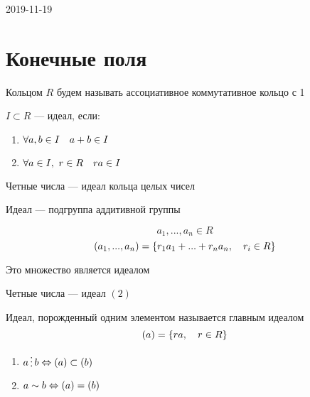 \documentclass[main.tex]{subfiles}
\begin{document}
\begin{lect}{2019-11-19}
    \section{Конечные поля}
    Кольцом $R$ будем называть ассоциативное коммутативное кольцо с 1
    \begin{definition}
        $I \subset R$ --- идеал, если:
        \begin{enumerate}
          \item $\forall a,b \in I \quad a + b \in I$
          \item $\forall a \in I,\ r \in R \quad ra \in I$
        \end{enumerate}
    \end{definition}

    \begin{example}
        Четные числа --- идеал кольца целых чисел
    \end{example}

    \begin{remark}

        Идеал --- подгруппа аддитивной группы
    \end{remark}

    \begin{Definition}[конструкция]
        \[a_1,..., a_n \in R\]
        \[(a_1,...,a_n) = \{ r_1 a_1 + ... + r_n a_n,\quad r_i \in R\} \]
    \end{Definition}

    \begin{utv}
        Это множество является идеалом
    \end{utv}

    \begin{example}
        Четные числа --- идеал $(2)$
    \end{example}

    \begin{definition}
        Идеал, порожденный одним элементом называется главным идеалом
        \[(a) = \{ ra,\quad r \in R\}\]
    \end{definition}

    \begin{properties}
        \begin{enumerate}
          \item $a \devides b \lra (a) \subset (b)$
          \item $a \sim b \Leftrightarrow (a) = (b)$
        \end{enumerate}
    \end{properties}


\end{lect}
\end{document}
